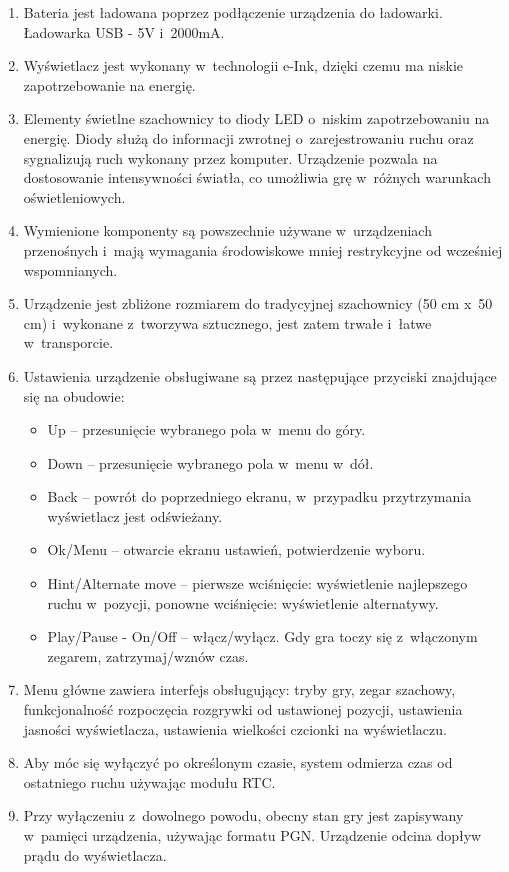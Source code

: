 \documentclass[12pt]{article}
\begin{document}
\begin{enumerate}
\item Bateria jest ładowana poprzez podłączenie urządzenia do ładowarki. Ładowarka USB - 5V i 2000mA.
\item Wyświetlacz jest wykonany w technologii e-Ink, dzięki czemu ma niskie zapotrzebowanie na energię.
\item Elementy świetlne szachownicy to diody LED o niskim zapotrzebowaniu na energię. Diody służą do informacji zwrotnej o zarejestrowaniu ruchu oraz sygnalizują ruch wykonany przez komputer. Urządzenie pozwala na dostosowanie intensywności światła, co umożliwia grę w różnych warunkach oświetleniowych.
\item Wymienione komponenty są powszechnie używane w urządzeniach przenośnych i mają wymagania środowiskowe mniej restrykcyjne od wcześniej wspomnianych.
\item Urządzenie jest zbliżone rozmiarem do tradycyjnej szachownicy (50 cm x 50 cm) i wykonane z tworzywa sztucznego, jest zatem trwałe i łatwe w transporcie.

\item Ustawienia urządzenie obsługiwane są przez następujące przyciski znajdujące się na obudowie:
\begin{itemize}
    \item Up -- przesunięcie wybranego pola w menu do góry.
    \item Down -- przesunięcie wybranego pola w menu w dół.
    \item Back -- powrót do poprzedniego ekranu, w przypadku przytrzymania wyświetlacz jest odświeżany. 
    \item Ok/Menu -- otwarcie ekranu ustawień, potwierdzenie wyboru.
    \item Hint/Alternate move -- pierwsze wciśnięcie: wyświetlenie najlepszego ruchu w pozycji, ponowne wciśnięcie: wyświetlenie alternatywy.
    \item Play/Pause - On/Off -- włącz/wyłącz. Gdy gra toczy się z włączonym zegarem, zatrzymaj/wznów czas.
\end{itemize}

\item Menu główne zawiera interfejs obsługujący: tryby gry, zegar szachowy, funkcjonalność rozpoczęcia rozgrywki od ustawionej pozycji, ustawienia jasności wyświetlacza, ustawienia wielkości czcionki na wyświetlaczu.
\item Aby móc się wyłączyć po określonym czasie, system odmierza czas od ostatniego ruchu używając modułu RTC.
\item Przy wyłączeniu z dowolnego powodu, obecny stan gry jest zapisywany w pamięci urządzenia, używając formatu PGN. Urządzenie odcina dopływ prądu do wyświetlacza.
\end{enumerate}
\end{document}
